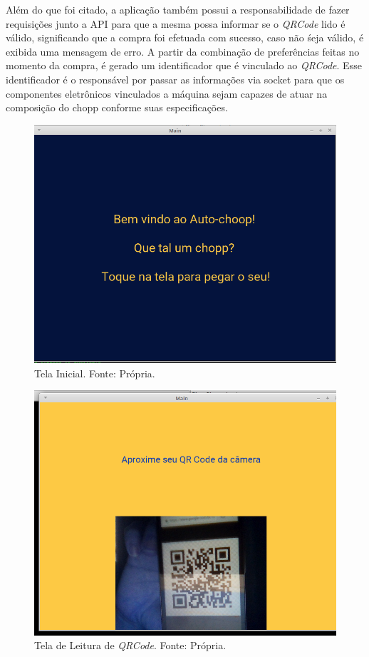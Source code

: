 Além do que foi citado, a aplicação também possui a responsabilidade de fazer requisições junto a API
para que a mesma possa informar se o \textit{QRCode} lido é válido, significando que a compra foi 
efetuada com sucesso, caso não śeja válido, é exibida uma mensagem de erro. A partir da combinação
de preferências feitas no momento da compra, é gerado um identificador que é vinculado ao 
\textit{QRCode}. Esse identificador é o responsável por passar as informações via socket para que
os componentes eletrônicos vinculados a máquina sejam capazes de atuar na composição do chopp conforme
suas especificações.

\begin{figure}[H]
    \centering
    \includegraphics[scale= 0.4]{figuras/home-screen.png}
    \caption{Tela Inicial. Fonte: Própria.}
    \label{home-screen}
\end{figure}

\begin{figure}[H]
    \centering
    \includegraphics[scale= 0.4]{figuras/leitor-qrcode.png}
    \caption{Tela de Leitura de \textit{QRCode}. Fonte: Própria.}
    \label{leitor-qrcode}
\end{figure}

